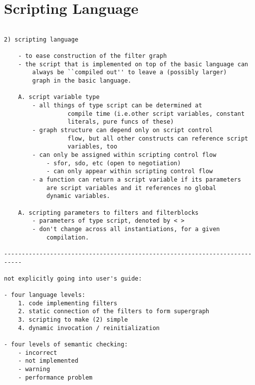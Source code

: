 \documentclass[draft]{article}
\begin{document}
\section{Scripting Language}
\label{sec:script}

\begin{verbatim}

2) scripting language

	- to ease construction of the filter graph
	- the script that is implemented on top of the basic language can
		always be ``compiled out'' to leave a (possibly larger) 
		graph in the basic language.

	A. script variable type
		- all things of type script can be determined at
                  compile time (i.e.other script variables, constant
                  literals, pure funcs of these)
		- graph structure can depend only on script control
                  flow, but all other constructs can reference script
                  variables, too
		- can only be assigned within scripting control flow
			- sfor, sdo, etc (open to negotiation)
			- can only appear within scripting control flow
		- a function can return a script variable if its parameters
			are script variables and it references no global
			dynamic variables.  

	A. scripting parameters to filters and filterblocks
		- parameters of type script, denoted by < >
		- don't change across all instantiations, for a given 
			compilation.

---------------------------------------------------------------------------

not explicitly going into user's guide:

- four language levels:
	1. code implementing filters
	2. static connection of the filters to form supergraph
	3. scripting to make (2) simple
	4. dynamic invocation / reinitialization

- four levels of semantic checking:
	- incorrect
	- not implemented
	- warning
	- performance problem

\end{verbatim}
\end{document}
